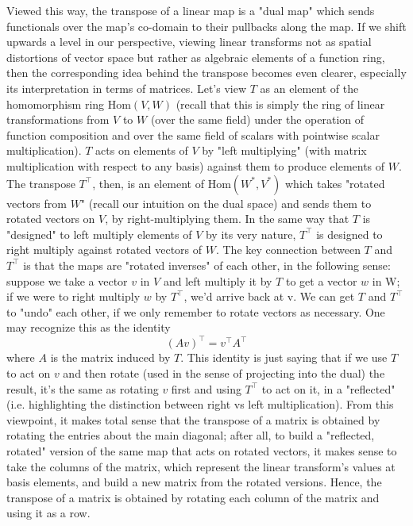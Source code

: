 \documentclass{article}
\newcommand{\Hom}{\text{Hom}}
\begin{document}
Viewed this way, the transpose of a linear map is a "dual map" which sends functionals over the map's co-domain to their pullbacks along the map. If we shift upwards a level in our perspective, viewing linear transforms not as spatial distortions of vector space but rather as algebraic elements of a function ring, then the corresponding idea behind the transpose becomes even clearer, especially its interpretation in terms of matrices. Let's view $ T $ as an element of the homomorphism ring $ \Hom(V, W) $ (recall that this is simply the ring of linear transformations from $ V $ to $ W $ (over the same field) under the operation of function composition and over the same field of scalars with pointwise scalar multiplication). $ T $ acts on elements of $ V $ by "left multiplying" (with matrix multiplication with respect to any basis) against them to produce elements of $ W $. The transpose $ T^\intercal $, then, is an element of $ \Hom(W^*, V^*) $ which takes "rotated vectors from $ W $" (recall our intuition on the dual space) and sends them to rotated vectors on $ V $, by right-multiplying them. In the same way that $ T $ is "designed" to left multiply elements of $ V $ by its very nature, $ T^\intercal $ is designed to right multiply against rotated vectors of $ W $. The key connection between $ T $ and $ T^\intercal $ is that the maps are "rotated inverses" of each other, in the following sense: suppose we take a vector $ v $ in $ V $ and left multiply it by $ T $ to get a vector $ w $ in W; if we were to right multiply $ w $ by $ T^\intercal $, we'd arrive back at v. We can get $ T $ and $ T^\intercal $ to "undo" each other, if we only remember to rotate vectors as necessary. One may recognize this as the identity
    $$ (A v)^\intercal = v^\intercal A^\intercal $$
where $ A $ is the matrix induced by $ T $. This identity is just saying that if we use $ T $ to act on $ v $ and then rotate (used in the sense of projecting into the dual) the result, it's the same as rotating $ v $ first and using $ T^\intercal $ to act on it, in a "reflected" (i.e. highlighting the distinction between right vs left multiplication). From this viewpoint, it makes total sense that the transpose of a matrix is obtained by rotating the entries about the main diagonal; after all, to build a "reflected, rotated" version of the same map that acts on rotated vectors, it makes sense to take the columns of the matrix, which represent the linear transform's values at basis elements, and build a new matrix from the rotated versions. Hence, the transpose of a matrix is obtained by rotating each column of the matrix and using it as a row.
\end{document}
